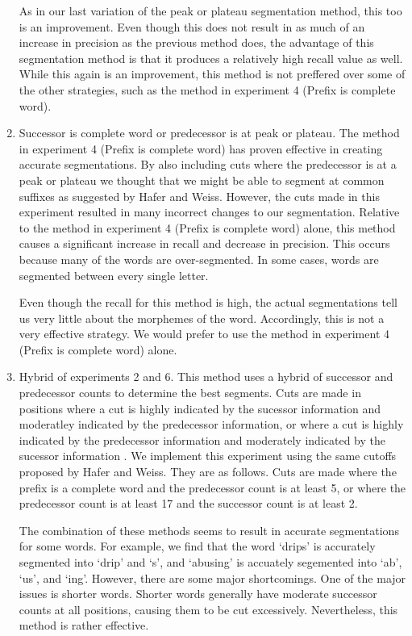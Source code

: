 \documentclass[11pt,letterpaper]{article}
\begin{document}
\begin{enumerate}
  As in our last variation of the peak or plateau segmentation method, this too is an improvement. Even though this does not result in as much of an increase in precision as the previous method does, the advantage of this segmentation method is that it produces a relatively high recall value as well. While this again is an improvement, this method is not preffered over some of the other strategies, such as the method in experiment 4 (Prefix is complete word).

\item Successor is complete word or predecessor is at peak or plateau. The method in experiment 4 (Prefix is complete word) has proven effective in creating accurate segmentations. By also including cuts where the predecessor is at a peak or plateau we thought that we might be able to segment at common suffixes as suggested by Hafer and Weiss. However, the cuts made in this experiment resulted in many incorrect changes to our segmentation. Relative to the method in experiment 4 (Prefix is complete word) alone, this method causes a significant increase in recall and decrease in precision. This occurs because many of the words are over-segmented. In some cases, words are segmented between every single letter.

  Even though the recall for this method is high, the actual segmentations tell us very little about the morphemes of the word. Accordingly, this is not a very effective strategy. We would prefer to use the method in experiment 4 (Prefix is complete word) alone.

\item Hybrid of experiments 2 and 6. This method uses a hybrid of successor and predecessor counts to determine the best segments. Cuts are made in positions where a cut is highly indicated by the sucessor information and moderatley indicated by the predecessor information, or where a cut is highly indicated by the predecessor information and moderately indicated by the sucessor information \cite{hafer1974-word}. We implement this experiment using the same cutoffs proposed by Hafer and Weiss. They are as follows. Cuts are made where the prefix is a complete word and the predecessor count is at least 5, or where the predecessor count is at least 17 and the successor count is at least 2.

The combination of these methods seems to result in accurate segmentations for some words. For example, we find that the word `drips' is accurately segmented into `drip' and `s', and `abusing' is accuately segemented into `ab', `us', and `ing'. However, there are some major shortcomings. One of the major issues is shorter words. Shorter words generally have moderate successor counts at all positions, causing them to be cut excessively. Nevertheless, this method is rather effective. 


\end{enumerate}
\end{document}
